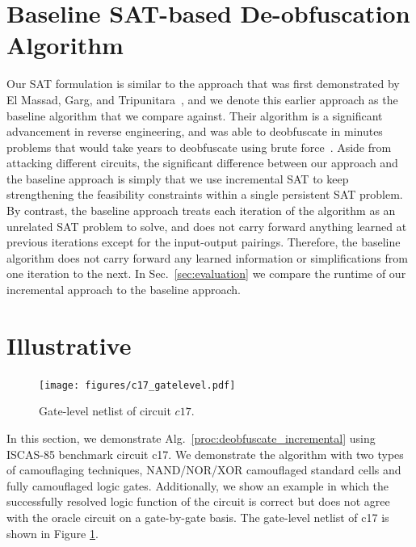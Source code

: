 \documentclass[proposal]{umassthesis}  %
\begin{document}

\section{Baseline SAT-based De-obfuscation Algorithm}
Our SAT formulation is similar to the approach that was first demonstrated by El Massad, Garg, and Tripunitara~\cite{elmassad-15}, and we denote this earlier approach as the baseline algorithm that we compare against. Their algorithm is a significant advancement in reverse engineering, and was able to deobfuscate in minutes problems that would take years to deobfuscate using brute force~\cite{rajendran-13}. Aside from attacking different circuits, the significant difference between our approach and the baseline approach is simply that we use incremental SAT to keep strengthening the feasibility constraints within a single persistent SAT problem. By contrast, the baseline approach treats each iteration of the algorithm as an unrelated SAT problem to solve, and does not carry forward anything learned at previous iterations except for the input-output pairings. Therefore, the baseline algorithm does not carry forward any learned information or simplifications from one iteration to the next. In Sec.~\ref{sec:evaluation} we compare the runtime of our incremental approach to the baseline approach.















\section{Illustrative}
\begin{figure}[t] 
\begin{center}
\texttt{[image: figures/c17\_gatelevel.pdf]}
\caption{Gate-level netlist of circuit $c17$.}
\label{fig:c17_original}
\end{center}
\end{figure}

In this section, we demonstrate Alg.~\ref{proc:deobfuscate_incremental} using ISCAS-85 benchmark circuit c17. We demonstrate the algorithm with two types of camouflaging techniques, NAND/NOR/XOR camouflaged standard cells and fully camouflaged logic gates. Additionally, we show an example in which the successfully resolved logic function of the circuit is correct but does not agree with the oracle circuit on a gate-by-gate basis. The gate-level netlist of c17 is shown in Figure \ref{fig:c17_original}.
\end{document}
